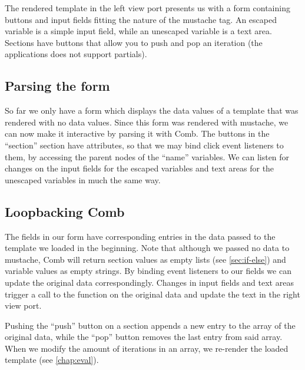 \documentclass[thesis.tex]{subfiles}
\begin{document}
The rendered template in the left view port presents us with a form containing
buttons and input fields fitting the nature of the mustache tag.
An escaped variable is a simple input field,
while an unescaped variable is a text area.
Sections have buttons that allow you to push and pop an iteration
(the applications does not support partials).

\subsection{Parsing the form}

So far we only have a form which displays the data values of a template that was
rendered with no data values.
Since this form was rendered with mustache, we can now make it interactive by
parsing it with Comb. The buttons in the ``section'' section have
 attributes, so that we may bind click event listeners to
them, by accessing the parent nodes of the ``name'' variables. We can listen
for changes on the input fields for the escaped variables and text areas for the
unescaped variables in much the same way.

\subsection{Loopbacking Comb}

The fields in our form have corresponding entries in the data passed to
the template we loaded in the beginning.
Note that although we passed no data to mustache, Comb will return
section values as empty lists (see \ref{sec:if-else}) and
variable values as empty strings.
By binding event listeners to our fields we can update the original data
correspondingly. Changes in input fields and text areas trigger a call to the
 function on the original data and update the text in the
right view port.

Pushing the ``push'' button on a section appends a new entry to the array of the
original data, while the ``pop'' button removes the last entry from said array.
When we modify the amount of iterations in an array, we re-render the loaded
template (see \ref{chap:eval}).
\end{document}
